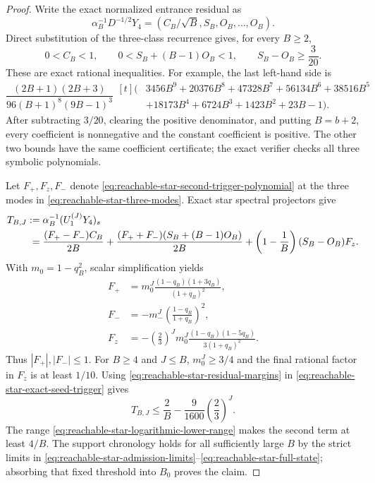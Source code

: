 \documentclass[11pt]{article}
\begin{document}
\begin{proof}
Write the exact normalized entrance residual as
\[
 \alpha_B^{-1}D^{-1/2}Y_4
 =\left(C_B/\sqrt B,S_B,O_B,\ldots,O_B\right).
\]
Direct substitution of the three-class recurrence gives, for every $B\geq2$,
\begin{equation}
 0<C_B<1,\qquad
 0<S_B+(B-1)O_B<1,\qquad
 S_B-O_B\geq\frac{3}{20}.
 \label{eq:reachable-star-residual-margins}
\end{equation}
These are exact rational inequalities.  For example, the last left-hand
side is
\[
 \frac{(2B+1)(2B+3)}{96(B+1)^8(9B-1)^3}
 \begin{aligned}[t]
 (&3456B^9+20376B^8+47328B^7+56134B^6+38516B^5\\
  &+18173B^4+6724B^3+1423B^2+23B-1).
 \end{aligned}
\]
After subtracting $3/20$, clearing the positive denominator, and putting
$B=b+2$, every coefficient is nonnegative and the constant coefficient is
positive.  The other two bounds have the same coefficient certificate; the
exact verifier checks all three symbolic polynomials.

Let $F_+,F_z,F_-$ denote \eqref{eq:reachable-star-second-trigger-polynomial}
at the three modes in \eqref{eq:reachable-star-three-modes}.  Exact star
spectral projectors give
\begin{align}
 T_{B,J}:={}&\alpha_B^{-1}(U_1^{(J)}Y_4)_s\notag\\
 ={}&\frac{(F_+-F_-)C_B}{2B}
 +\frac{(F_++F_-)(S_B+(B-1)O_B)}{2B}
 +\left(1-\frac1B\right)(S_B-O_B)F_z.
 \label{eq:reachable-star-exact-seed-trigger}
\end{align}
With $m_0=1-q_B^2$, scalar simplification yields
\begin{align*}
 F_+&=m_0^J\frac{(1-q_B)(1+3q_B)}{(1+q_B)^2},\\
 F_-&=-m_-^J\left(\frac{1-q_B}{1+q_B}\right)^2,\\
 F_z&=-\left(\frac23\right)^Jm_0^J
 \frac{(1-q_B)(1-5q_B)}{3(1+q_B)^2}.
\end{align*}
Thus $|F_+|,|F_-|\leq1$.  For $B\geq4$ and $J\leq B$,
$m_0^J\geq3/4$ and the final rational factor in $F_z$ is at least $1/10$.
Using \eqref{eq:reachable-star-residual-margins} in
\eqref{eq:reachable-star-exact-seed-trigger} gives
\begin{equation}
 T_{B,J}\leq\frac{2}{B}
 -\frac{9}{1600}\left(\frac23\right)^J.
 \label{eq:reachable-star-quantitative-trigger-bound}
\end{equation}
The range \eqref{eq:reachable-star-logarithmic-lower-range} makes the second
term at least $4/B$.  The support chronology holds for all sufficiently
large $B$ by the strict limits in
\eqref{eq:reachable-star-admission-limits}--\eqref{eq:reachable-star-full-state};
absorbing that fixed threshold into $B_0$ proves the claim.
\end{proof}
\end{document}
